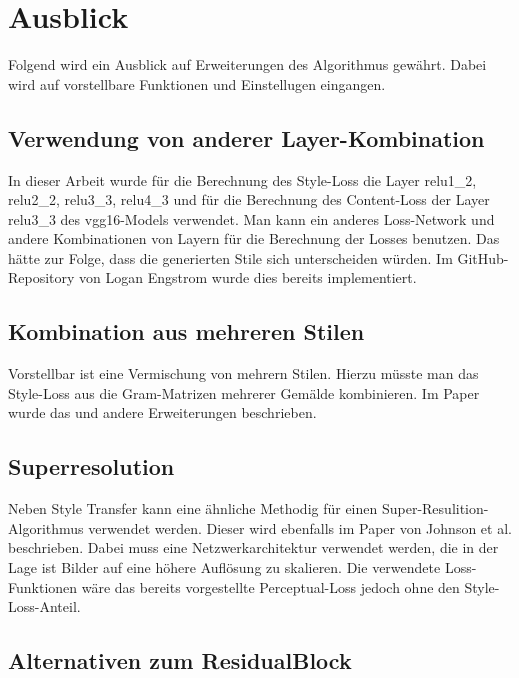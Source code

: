 \section{Ausblick}

Folgend wird ein Ausblick auf Erweiterungen des Algorithmus gewährt. Dabei wird auf vorstellbare Funktionen und Einstellugen eingangen.

\subsection{Verwendung von anderer Layer-Kombination}

In dieser Arbeit wurde für die Berechnung des Style-Loss die Layer relu1\_2, relu2\_2, relu3\_3, relu4\_3 und für die Berechnung des Content-Loss der Layer relu3\_3 des \gls{vgg16}-Models verwendet. Man kann ein anderes Loss-Network und andere Kombinationen von Layern für die Berechnung der Losses benutzen. Das hätte zur Folge, dass die generierten Stile sich unterscheiden würden. Im GitHub-Repository von Logan Engstrom  \cite{engstrom2016faststyletransfer} wurde dies bereits implementiert.

\subsection{Kombination aus mehreren Stilen}
\label{sec:combination_many_styles}

Vorstellbar ist eine Vermischung von mehrern Stilen. Hierzu müsste man das Style-Loss aus die Gram-Matrizen mehrerer Gemälde kombinieren. Im Paper \cite{stanfordStyleTransfer} wurde das und andere Erweiterungen beschrieben.

\subsection{Superresolution}
\label{sec:superresolution}

Neben Style Transfer kann eine ähnliche Methodig für einen Super-Resulition-Algorithmus verwendet werden. Dieser wird ebenfalls im Paper von Johnson et al. \cite{DBLP:journals/corr/JohnsonAL16} beschrieben. Dabei muss eine Netzwerkarchitektur verwendet werden, die in der Lage ist Bilder auf eine höhere Auflösung zu skalieren. Die verwendete Loss-Funktionen wäre das bereits vorgestellte Perceptual-Loss jedoch ohne den Style-Loss-Anteil.

\subsection{Alternativen zum ResidualBlock}
\label{sec:alternatives_to_residual_block}

